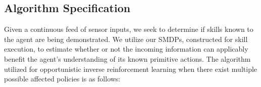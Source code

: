 \documentclass[letterpaper]{article}
\begin{document}
\subsection{Algorithm Specification}
\label{sec:recognition}
Given a continuous feed of sensor inputs, we seek to determine if skills known to the agent are being demonstrated. We utilize our SMDPs, constructed for skill execution, to estimate whether or not the incoming information can applicably benefit the agent's understanding of its known primitive actions. The algorithm utilized for opportunistic inverse reinforcement learning when there exist multiple possible affected policies is as follows:
\end{document}
